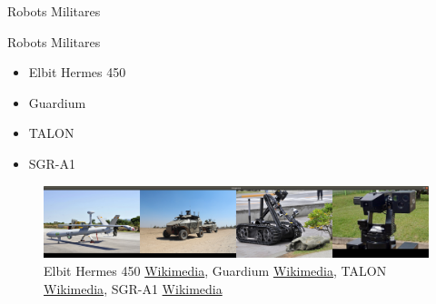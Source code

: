 
\begin{frame}[fragile]{Robots Militares}
\vspace{10px}
\pause
{}
\begin{block}{Robots Militares}
	\begin{itemize}
		\item Elbit Hermes 450
		\pause
		\item Guardium
		\pause
		\item TALON
		\pause
		\item SGR-A1
	\end{itemize}
\end{block}
\begin{figure}
	\centering
	\pause
	\centering
	\includegraphics[scale=0.11]{./EtapaModerna/Imagenes/robots_militares.png}
	\caption{Elbit Hermes 450 \href{https://commons.wikimedia.org/wiki/File:Vant_Hermes_450_da_FAB_no_aeroporto_de_C\%C3\%A1ceres_(MT)_(8101398607).jpg}{Wikimedia}, Guardium \href{https://ca.wikipedia.org/wiki/Fitxer:Flickr_-_Israel_Defense_Forces_-_Israeli_Made_Guardium_UGV_(5).jpg}{Wikimedia}, TALON \href{https://commons.wikimedia.org/wiki/File:US_Navy_090512-N-2013O-013_A_Mark_II_Talon_robot_from_Explosive_Ordnance_Disposal_Mobile_Unit_5,_Det._Japan,_is_used_to_inspect_a_suspicious_package_during_a_force_protection-anti-terrorism_training_exercise.jpg}{Wikimedia}, SGR-A1 \href{https://commons.wikimedia.org/wiki/File:SGR-A1.jpg}{Wikimedia}}
\end{figure}
\end{frame}


